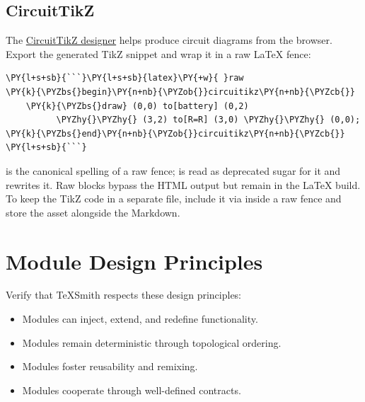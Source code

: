 \documentclass[a4paper,twoside]{article}
\begin{document}
\subsection{CircuitTikZ}
The \href{https://circuit2tikz.tf.fau.de/designer/}{CircuitTikZ designer} helps produce circuit diagrams from the browser. Export the generated TikZ snippet and wrap it in a raw \LaTeX{} fence:
\begin{tscode}[lang=markdown, engine=pygments]
\begin{Verbatim}[commandchars=\\\{\},breaklines, breakanywhere, commandchars=\\\{\}]
\PY{l+s+sb}{```}\PY{l+s+sb}{latex}\PY{+w}{ }raw
\PY{k}{\PYZbs{}begin}\PY{n+nb}{\PYZob{}}circuitikz\PY{n+nb}{\PYZcb{}}
    \PY{k}{\PYZbs{}draw} (0,0) to[battery] (0,2)
          \PYZhy{}\PYZhy{} (3,2) to[R=R] (3,0) \PYZhy{}\PYZhy{} (0,0);
\PY{k}{\PYZbs{}end}\PY{n+nb}{\PYZob{}}circuitikz\PY{n+nb}{\PYZcb{}}
\PY{l+s+sb}{```}
\end{Verbatim}
\end{tscode}
 is the canonical spelling of a raw fence;  is read
as deprecated sugar for it and  rewrites it. Raw blocks bypass
the HTML output but remain in the \LaTeX{} build. To keep the TikZ code in a separate file, include it via  inside a raw fence and store the  asset alongside the Markdown.
\section{Module Design Principles}
Verify that TeXSmith respects these design principles:
\begin{itemize}
\item Modules can inject, extend, and redefine functionality.
\item Modules remain deterministic through topological ordering.
\item Modules foster reusability and remixing.
\item Modules cooperate through well-defined contracts.
\end{itemize}
\end{document}
